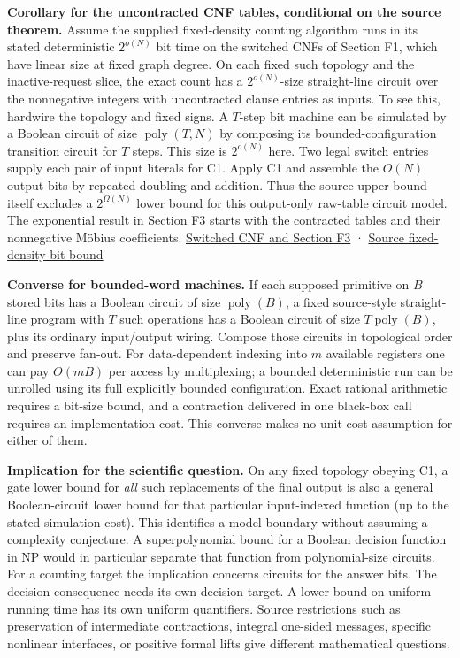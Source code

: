 \documentclass[
  11pt,
]{article}
\begin{document}
\textbf{Corollary for the uncontracted CNF tables, conditional on the
source theorem.} Assume the supplied fixed-density counting algorithm
runs in its stated deterministic \(2^{o(N)}\) bit time on the switched
CNFs of Section F1, which have linear size at fixed graph degree. On
each fixed such topology and the inactive-request slice, the exact count
has a \(2^{o(N)}\)-size straight-line circuit over the nonnegative
integers with uncontracted clause entries as inputs. To see this,
hardwire the topology and fixed signs. A \(T\)-step bit machine can be
simulated by a Boolean circuit of size \(\operatorname{poly}(T,N)\) by
composing its bounded-configuration transition circuit for \(T\) steps.
This size is \(2^{o(N)}\) here. Two legal switch entries supply each
pair of input literals for C1. Apply C1 and assemble the \(O(N)\) output
bits by repeated doubling and addition. Thus the source upper bound
itself excludes a \(2^{\Omega(N)}\) lower bound for this output-only
raw-table circuit model. The exponential result in Section F3 starts
with the contracted tables and their nonnegative Möbius coefficients.
\hyperref[v8-section-stronger-family]{Switched CNF and Section F3} ·
\href{https://github.com/openai/math/blob/main/preprints/The-Exponential-Time-Hypothesis-is-False-October-25-2026/build/quantitative-reduction.tex\#L86}{Source
fixed-density bit bound}

\textbf{Converse for bounded-word machines.} If each supposed primitive
on \(B\) stored bits has a Boolean circuit of size
\(\operatorname{poly}(B)\), a fixed source-style straight-line program
with \(T\) such operations has a Boolean circuit of size
\(T\operatorname{poly}(B)\), plus its ordinary input/output wiring.
Compose those circuits in topological order and preserve fan-out. For
data-dependent indexing into \(m\) available registers one can pay
\(O(mB)\) per access by multiplexing; a bounded deterministic run can be
unrolled using its full explicitly bounded configuration. Exact rational
arithmetic requires a bit-size bound, and a contraction delivered in one
black-box call requires an implementation cost. This converse makes no
unit-cost assumption for either of them.

\textbf{Implication for the scientific question.} On any fixed topology
obeying C1, a gate lower bound for \emph{all} such replacements of the
final output is also a general Boolean-circuit lower bound for that
particular input-indexed function (up to the stated simulation cost).
This identifies a model boundary without assuming a complexity
conjecture. A superpolynomial bound for a Boolean decision function in
NP would in particular separate that function from polynomial-size
circuits. For a counting target the implication concerns circuits for
the answer bits. The decision consequence needs its own decision target.
A lower bound on uniform running time has its own uniform quantifiers.
Source restrictions such as preservation of intermediate contractions,
integral one-sided messages, specific nonlinear interfaces, or positive
formal lifts give different mathematical questions.
\end{document}
